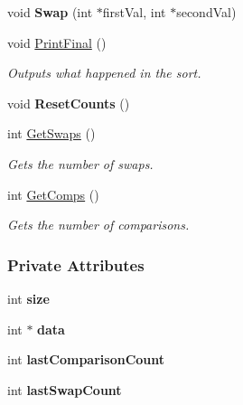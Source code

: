 \begin{DoxyCompactItemize}
\item 
void {\bfseries Swap} (int $\ast$first\+Val, int $\ast$second\+Val)\hypertarget{class_merge_sort_a06368d7437ae210f88ea3fa531f30e0f}{}\label{class_merge_sort_a06368d7437ae210f88ea3fa531f30e0f}

\item 
void \hyperlink{class_merge_sort_a02132743e011fd008d14cb6d2e4572e9}{Print\+Final} ()
\begin{DoxyCompactList}\small\item\em Outputs what happened in the sort. \end{DoxyCompactList}\item 
void {\bfseries Reset\+Counts} ()\hypertarget{class_merge_sort_a96372cd3f60131b422010e816c837f3c}{}\label{class_merge_sort_a96372cd3f60131b422010e816c837f3c}

\item 
int \hyperlink{class_merge_sort_aa09d69026e874d684cde60a05da1730f}{Get\+Swaps} ()
\begin{DoxyCompactList}\small\item\em Gets the number of swaps. \end{DoxyCompactList}\item 
int \hyperlink{class_merge_sort_aa3b74203993c3194544f498fe9bfab42}{Get\+Comps} ()
\begin{DoxyCompactList}\small\item\em Gets the number of comparisons. \end{DoxyCompactList}\end{DoxyCompactItemize}
\subsubsection*{Private Attributes}
\begin{DoxyCompactItemize}
\item 
int {\bfseries size}\hypertarget{class_merge_sort_a4fa726789d196e248d09f2873ac694df}{}\label{class_merge_sort_a4fa726789d196e248d09f2873ac694df}

\item 
int $\ast$ {\bfseries data}\hypertarget{class_merge_sort_a039eed2246f7043bd3aad1ad1b1728b3}{}\label{class_merge_sort_a039eed2246f7043bd3aad1ad1b1728b3}

\item 
int {\bfseries last\+Comparison\+Count}\hypertarget{class_merge_sort_ae93d6d3917323bcb7c02ed29cebcc045}{}\label{class_merge_sort_ae93d6d3917323bcb7c02ed29cebcc045}

\item 
int {\bfseries last\+Swap\+Count}\hypertarget{class_merge_sort_a4f54218d220d979a1d4a6694cc10e63d}{}\label{class_merge_sort_a4f54218d220d979a1d4a6694cc10e63d}

\end{DoxyCompactItemize}


